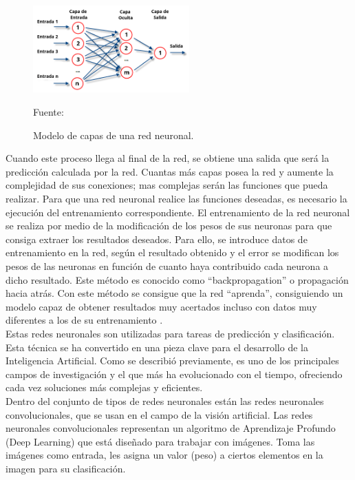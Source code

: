 \begin{figure}[H]
    \begin{center}
        \includegraphics[width=6cm]{img/capitulo_2/Redes_neuronales_esquema.png}
        \caption{Modelo de capas de una red neuronal.}
        Fuente: \cite{perceptron_multicapa}
        \label{fig:estructura_red_neuronal}
    \end{center}
\end{figure}

Cuando este proceso llega al final de la red, se obtiene una salida que será la predicción calculada por la red. Cuantas más capas posea la red y aumente la complejidad de sus conexiones; mas complejas serán las funciones que pueda realizar. Para que una red neuronal realice las funciones deseadas, es necesario la ejecución del entrenamiento correspondiente. El entrenamiento de la red neuronal se realiza por medio de la modificación de los pesos de sus neuronas para que consiga extraer los resultados deseados. Para ello, se introduce datos de entrenamiento en la red, según el resultado obtenido y el error se modifican los pesos de las neuronas en función de cuanto haya contribuido cada neurona a dicho resultado. Este método es conocido como ``backpropagation'' o propagación hacia atrás. Con este método se consigue que la red ``aprenda'', consiguiendo un modelo capaz de obtener resultados muy acertados incluso con datos muy diferentes a los de su entrenamiento \cite{atriainnovation:ia}.\\

Estas redes neuronales son utilizadas para tareas de predicción y clasificación. Esta técnica se ha convertido en una pieza clave para el desarrollo de la Inteligencia Artificial. Como se describió previamente, es uno de los principales campos de investigación y el que más ha evolucionado con el tiempo, ofreciendo cada vez soluciones más complejas y eficientes.\\

Dentro del conjunto de tipos de redes neuronales están las redes neuronales convolucionales, que se usan en el campo de la visión artificial. Las redes neuronales convolucionales representan un algoritmo de Aprendizaje Profundo (Deep Learning) que está diseñado para trabajar con imágenes. Toma las imágenes como entrada, les asigna un valor (peso) a ciertos elementos en la imagen para su clasificación.\\

